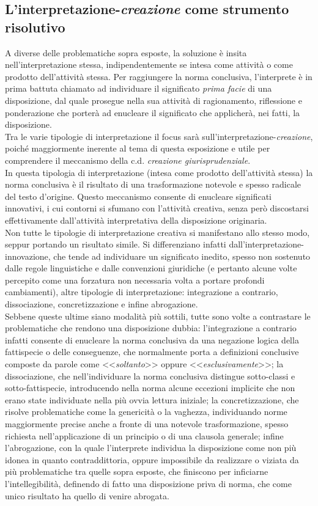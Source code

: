 \subsection{L'interpretazione-\textit{creazione} come strumento risolutivo}
A diverse delle problematiche sopra esposte, la soluzione è insita nell'interpretazione stessa, indipendentemente se intesa come attività o come prodotto dell'attività stessa.
Per raggiungere la norma conclusiva, l'interprete è in prima battuta chiamato ad individuare il significato \textit{prima facie} di una disposizione, dal quale prosegue nella sua attività di ragionamento, riflessione e ponderazione che porterà ad enucleare il significato che applicherà, nei fatti, la disposizione.
\\Tra le varie tipologie di interpretazione il focus sarà sull'interpretazione-\textit{creazione}, poiché maggiormente inerente al tema di questa esposizione e utile per comprendere il meccanismo della c.d. \textit{creazione giurisprudenziale}.
\\In questa tipologia di interpretazione (intesa come prodotto dell'attività stessa) la norma conclusiva è il risultato di una trasformazione notevole e spesso radicale del testo d'origine.
Questo meccanismo consente di enucleare significati innovativi, i cui contorni si sfumano con l'attività creativa, senza però discostarsi effettivamente dall'attività interpretativa della disposizione originaria.
\\Non tutte le tipologie di interpretazione creativa si manifestano allo stesso modo, seppur portando un risultato simile.
Si differenziano infatti dall'interpretazione-innovazione, che tende ad individuare un significato inedito, spesso non sostenuto dalle regole linguistiche e dalle convenzioni giuridiche (e pertanto alcune volte percepito come una forzatura non necessaria volta a portare profondi cambiamenti), altre tipologie di interpretazione: integrazione a contrario, dissociazione, concretizzazione e infine abrogazione.
\\Sebbene queste ultime siano modalità più sottili, tutte sono volte a contrastare le problematiche che rendono una disposizione dubbia: l'integrazione a contrario infatti consente di enucleare la norma conclusiva da una negazione logica della fattispecie o delle conseguenze, che normalmente porta a definizioni conclusive composte da parole come <<\textit{soltanto}>> oppure <<\textit{esclusivamente}>>; la dissociazione, che nell'individuare la norma conclusiva distingue sotto-classi e sotto-fattispecie, introducendo nella norma alcune eccezioni implicite che non erano state individuate nella più ovvia lettura iniziale; la concretizzazione, che risolve problematiche come la genericità o la vaghezza, individuando norme maggiormente precise anche a fronte di una notevole trasformazione, spesso richiesta nell'applicazione di un principio o di una clausola generale; infine l'abrogazione, con la quale l'interprete individua la disposizione come non più idonea in quanto contraddittoria, oppure impossibile da realizzare o viziata da più problematiche tra quelle sopra esposte, che finiscono per inficiarne l'intellegibilità, definendo di fatto una disposizione priva di norma, che come unico risultato ha quello di venire abrogata.
